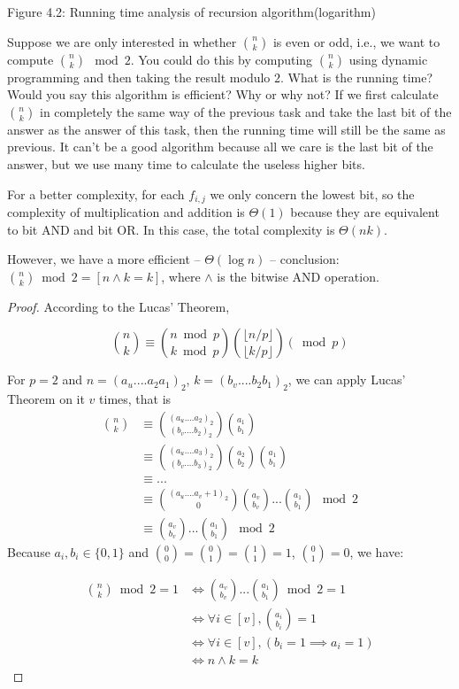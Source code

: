 \documentclass[11pt,a4paper,oneside]{article}
\begin{document}
\begin{problem}{4}
\begin{center}
	Figure 4.2: Running time analysis of recursion algorithm(logarithm)
	\end{center}
\end{problem}

\begin{problem}{5}
    \statement
    Suppose we are only interested in whether ${n \choose k}$ is even or odd,
  i.e., we want to compute ${n \choose k}  \mod 2$. You could do this by computing 
  ${n \choose k}$ using dynamic programming and then taking
  the result modulo $2$. What is the running time? Would you say this algorithm
  is efficient? Why or why not?
  \solution
If we first calculate ${n \choose k}$ in completely the same way of the previous task and take the last bit of the answer as the answer of this task, then the running time will still be the same as previous. It can't be a good algorithm because all we care is the last bit of the answer, but we use many time to calculate the useless higher bits.

For a better complexity, for each $f_{i, j}$ we only concern the lowest bit, so the complexity of multiplication and addition is $\Theta(1)$ because they are equivalent to bit AND and bit OR. In this case, the total complexity is $\Theta(nk)$.

However, we have a more efficient  -- $\Theta (\log n)$ -- conclusion:  $ {n \choose k} \bmod 2 = [n \wedge k = k]$, where $\wedge$ is the bitwise AND operation.
	\begin{proof}
		According to the Lucas' Theorem, 
		
		\[
			{n \choose k}\equiv{{n \bmod p} \choose {k \bmod p}}{{ \lfloor n/p\rfloor} \choose { \lfloor k/p\rfloor}}(\bmod p)
		\]
		
		For $p=2$ and $n=(a_u....a_2a_1)_2$, $k=(b_v....b_2b_1)_2$, we can apply Lucas' Theorem on it $v$ times, that is
		\begin{align*}
			{n \choose k} &\equiv {(a_u....a_2)_2 \choose (b_v....b_2)_2}{a_1 \choose b_1}\\
			&\equiv {(a_u....a_3)_2 \choose (b_v....b_3)_2}{a_2 \choose b_2}{a_1 \choose b_1} \\
			&\equiv ...\\	
			&\equiv {(a_u....a_v+1)_2 \choose 0}{a_v \choose b_v}...{a_1 \choose b_1}\mod 2\\
			&\equiv {a_v \choose b_v}...{a_1 \choose b_1}\mod 2
		\end{align*}		
		Because $a_i,b_i\in \{0,1\}$ and ${0 \choose 0}={0 \choose 1}={1 \choose 1}=1$, ${0 \choose 1}=0$, we have:
		
		\[
			\begin{split}
			{n \choose k} \bmod 2 = 1 &\Leftrightarrow {a_v \choose b_v}...{a_1 \choose b_1}\bmod 2=1 \\
			&\Leftrightarrow \forall i \in [v], {a_i \choose b_i}=1\\
			&\Leftrightarrow \forall i \in [v], (b_i=1\implies a_i=1)\\
			&\Leftrightarrow n \wedge k = k
			\end{split}
		\]		
    \end{proof}
\end{problem}
\end{document}
